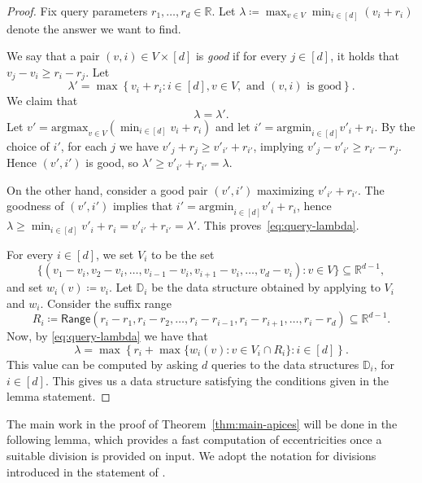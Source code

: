 \documentclass[11pt,a4paper]{article}
\newcommand{\argmax}{\text{argmax}}
\newcommand{\argmin}{\text{argmin}}
\renewcommand{\geq}{\geqslant}
\begin{document}
\begin{proof}
    Fix query parameters $r_1, \dots, r_d \in \mathbb{R}$.
    Let $\lambda \coloneqq \max_{v \in V} \min_{i \in [d]} (v_i + r_i)$ denote the answer we want to find.
    
    We say that a pair $(v,i) \in V \times [d]$ is \emph{good} if
    for every $j \in [d]$, it holds that $v_j - v_i \geq r_i -r_j$.
    Let
    $$
    		\lambda' = \max \left\{ v_i + r_i \colon i\in [d], v\in V,\textrm{ and }(v,i)\textrm{ is good} \right\}.
    $$
    We claim that 
    \begin{equation}
    \label{eq:query-lambda}
    \lambda = \lambda'.
   \end{equation}
   Let $v' = \argmax_{v \in V} (\min_{i \in [d]} v_i + r_i)$ and let $i' = \argmin_{i \in [d]} v'_i + r_i$. By the choice of $i'$, for each $j$ we have $v'_j+r_j\geq v'_{i'}+r_{i'}$, implying $v'_j - v'_{i'} \geq r_{i'} - r_j$. Hence $(v',i')$ is good, so $\lambda' \geq v'_{i'} + r_{i'} = \lambda$.
    
    On the other hand, consider a good pair $(v', i')$ maximizing $v'_{i'} + r_{i'}$.
    The goodness of $(v',i')$ implies that $i' = \argmin_{i \in [d]} v'_i + r_i$, hence $\lambda \geq \min_{i \in [d]} v'_i + r_i = v'_{i'} + r_{i'} = \lambda'$. This proves~\eqref{eq:query-lambda}.
    
    For every $i \in [d]$, we set $V_i$ to be the set
    $$ 
    		\{ (v_1 - v_i, v_2 - v_i, \dots, v_{i - 1} - v_i, v_{i + 1} - v_i, \dots, v_d - v_i) : v \in V \}\subseteq \mathbb{R}^{d-1},
    	$$
    	and set $w_i(v) \coloneqq v_i$. Let $\mathbb{D}_i$ be the data structure obtained by applying  to $V_i$ and $w_i$. Consider the suffix range
    $$
    		R_i\coloneqq \mathsf{Range}(r_i - r_1, r_i-r_2, \dots, r_i - r_{i - 1}, r_i - r_{i + 1}, \dots,  r_i - r_d)\subseteq \mathbb{R}^{d-1}.
    $$
    Now, by \eqref{eq:query-lambda} we have that
    $$
    		\lambda = \max \left\{ r_i + \max \{ w_i(v) : v \in V_i \cap R_i \}\colon i\in [d] \right\}.
    $$
    This value can be computed by asking $d$ queries to the data structures $\mathbb{D}_i$, for $i\in [d]$. This gives us a data structure satisfying the conditions given in the lemma statement.
\end{proof}

The main work in the proof of Theorem~\ref{thm:main-apices} will be done in the following lemma,
which provides a fast computation of eccentricities once a suitable division is provided on input.
We adopt the notation for divisions introduced in the statement of .
\end{document}
